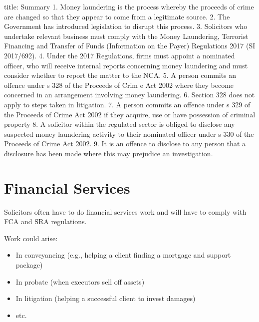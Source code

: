 \documentclass[
]{article}
\newenvironment{Shaded}{}{}
\newcommand{\NormalTok}[1]{#1}
\providecommand{\tightlist}{%
  \setlength{\itemsep}{0pt}\setlength{\parskip}{0pt}}
\begin{document}
\begin{Shaded}
\begin{Highlighting}[]
\NormalTok{title: Summary}
\NormalTok{1. Money laundering is the process whereby the proceeds of crime are changed so that they appear to come from a legitimate source.  }
\NormalTok{2. The Government has introduced legislation to disrupt this process.  }
\NormalTok{3. Solicitors who undertake relevant business must comply with the Money Laundering, Terrorist Financing and Transfer of Funds (Information on the Payer) Regulations 2017 (SI 2017/692).  }
\NormalTok{4. Under the 2017 Regulations, firms must appoint a nominated officer, who will receive internal reports concerning money laundering and must consider whether to report the matter to the NCA.  }
\NormalTok{5. A person commits an offence under s 328 of the Proceeds of Crim e Act 2002 where they become concerned in an arrangement involving money laundering.  }
\NormalTok{6. Section 328 does not apply to steps taken in litigation.  }
\NormalTok{7. A person commits an offence under s 329 of the Proceeds of Crime Act 2002 if they acquire, use or have possession of criminal property  }
\NormalTok{8. A solicitor within the regulated sector is obliged to disclose any suspected money laundering activity to their nominated officer under s 330 of the Proceeds of Crime Act 2002.  }
\NormalTok{9. It is an offence to disclose to any person that a disclosure has been made where this may prejudice an investigation.}
\end{Highlighting}
\end{Shaded}

\hypertarget{financial-services}{%
\section{Financial Services}\label{financial-services}}

Solicitors often have to do financial services work and will have to
comply with FCA and SRA regulations.

Work could arise:

\begin{itemize}
\tightlist
\item
  In conveyancing (e.g., helping a client finding a mortgage and support
  package)
\item
  In probate (when executors sell off assets)
\item
  In litigation (helping a successful client to invest damages)
\item
  etc.
\end{itemize}
\end{document}
